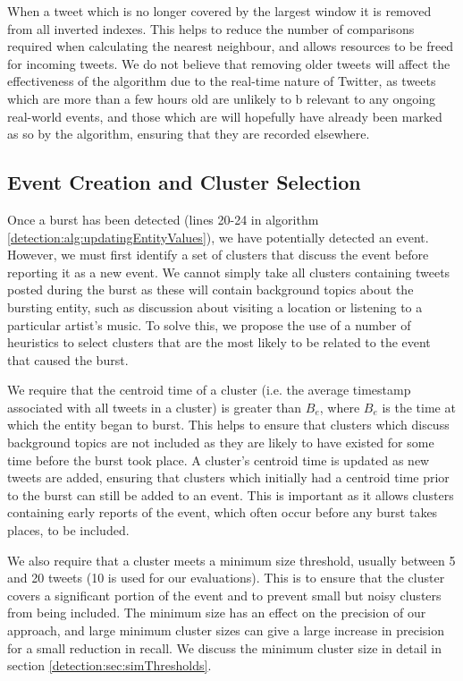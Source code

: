 When a tweet which is no longer covered by the largest window it is removed from all inverted indexes.
This helps to reduce the number of comparisons required when calculating the nearest neighbour, and allows resources to be freed for incoming tweets.
We do not believe that removing older tweets will affect the effectiveness of the algorithm due to the real-time nature of Twitter, as tweets which are more than a few hours old are unlikely to b relevant to any ongoing real-world events, and those which are will hopefully have already been marked as so by the algorithm, ensuring that they are recorded elsewhere.

\subsection{Event Creation and Cluster Selection}
\label{detection:sec:eventCreation}
Once a burst has been detected (lines 20-24 in algorithm \ref{detection:alg:updatingEntityValues}), we have potentially detected an event.
However, we must first identify a set of clusters that discuss the event before reporting it as a new event.
We cannot simply take all clusters containing tweets posted during the burst as these will contain background topics about the bursting entity, such as discussion about visiting a location or listening to a particular artist's music.
To solve this, we propose the use of a number of heuristics to select clusters that are the most likely to be related to the event that caused the burst.

We require that the centroid time of a cluster (i.e. the average timestamp associated with all tweets in a cluster) is greater than \(B_e\), where \(B_e\) is the time at which the entity began to burst.
This helps to ensure that clusters which discuss background topics are not included as they are likely to have existed for some time before the burst took place.
A cluster's centroid time is updated as new tweets are added, ensuring that clusters which initially had a centroid time prior to the burst can still be added to an event.
This is important as it allows clusters containing early reports of the event, which often occur before any burst takes places, to be included.

We also require that a cluster meets a minimum size threshold, usually between 5 and 20 tweets (10 is used for our evaluations).
This is to ensure that the cluster covers a significant portion of the event and to prevent small but noisy clusters from being included. The minimum size has an effect on the precision of our approach, and large minimum cluster sizes can give a large increase in precision for a small reduction in recall.
We discuss the minimum cluster size in detail in section \ref{detection:sec:simThresholds}.

